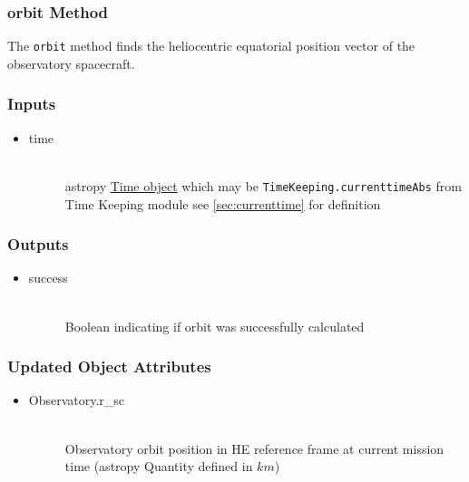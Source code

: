 \documentclass[cleanfoot]{asme2ej}
\begin{document}
\subsubsection{orbit Method} \label{sec:orbittask}
The \verb+orbit+ method finds the heliocentric equatorial position vector of the observatory spacecraft.

\subsubsection*{Inputs}
\begin{itemize}
    \item
    \begin{description}
        \item[time] \hfill \\
        astropy \href{http://astropy.readthedocs.org/en/latest/time/index.html}{Time object} which may be \verb+TimeKeeping.currenttimeAbs+ from Time Keeping module see \ref{sec:currenttime} for definition
    \end{description}
\end{itemize}

\subsubsection*{Outputs}
\begin{itemize}
    \item
    \begin{description}
        \item[success] \hfill \\
        Boolean indicating if orbit was successfully calculated
    \end{description}
\end{itemize}

\subsubsection*{Updated Object Attributes}
\begin{itemize}
    \item
    \begin{description}
        \item[Observatory.r\_sc] \hfill \\
        Observatory orbit position in HE reference frame at current mission time (astropy Quantity defined in $ km $)
    \end{description}
\end{itemize}
\end{document}
